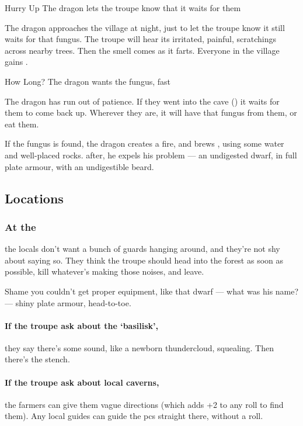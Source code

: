 \documentclass[10pt,twoside]{book}
\begin{document}
{Hurry Up}%
{The dragon lets the troupe know that it waits for them}%

The dragon approaches the \gls{village} at night, just to let the troupe know it still waits for that fungus.
The troupe will hear its irritated, painful, scratchings across nearby trees.
Then the smell comes as it farts.
Everyone in the \gls{village} gains .

{How Long?}%
{The dragon wants the fungus, fast}%

The dragon has run out of patience.
If they went into the cave () it waits for them to come back up.
Wherever they are, it will have that fungus from them, or eat them.

If the fungus is found, the dragon creates a fire, and brews , using some water and well-placed rocks.
 after, he expels his problem --- an undigested dwarf, in full plate armour, with an undigestible beard.

\subsection{Locations}

\subsubsection{At the }\label{wyrmBailey}
the locals don't want a bunch of \glspl{guard} hanging around, and they're not shy about saying so.
They think the troupe should head into the forest as soon as possible, kill whatever's making those noises, and leave.

\begin{speechtext}
  Shame you couldn't get proper equipment, like that dwarf --- what was his name? --- shiny plate armour, head-to-toe.
\end{speechtext}

\paragraph{If the troupe ask about the `\gls{basilisk}',}
they say there's some sound, like a newborn thundercloud, squealing.
Then there's the stench.

\paragraph{If the troupe ask about local caverns,}
the farmers can give them vague directions (which adds +2 to any roll to find them).
Any local guides can guide the \glspl{pc} straight there, without a roll.
\end{document}
